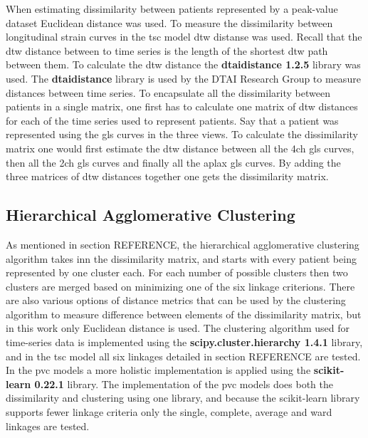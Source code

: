 When estimating dissimilarity between patients represented by a peak-value dataset Euclidean distance was used. To measure the dissimilarity between longitudinal strain curves in the \acrshort{tsc} model \acrshort{dtw} distanse was used. Recall that the \acrshort{dtw} distance between to time series is the length of the shortest \acrshort{dtw} path between them. To calculate the \acrshort{dtw} distance the \textbf{dtaidistance 1.2.5} library was used. The \textbf{dtaidistance} library is used by the DTAI Research Group to measure distances between time series. To encapsulate all the dissimilarity between patients in a single matrix, one first has to calculate one matrix of \acrshort{dtw} distances for each of the time series used to represent patients. Say that a patient was represented using the \acrshort{gls} curves in the three views. To calculate the dissimilarity matrix one would first estimate the \acrshort{dtw} distance between all the \acrshort{4ch} \acrshort{gls} curves, then all the \acrshort{2ch} \acrshort{gls} curves and finally all the \acrshort{aplax} \acrshort{gls} curves. By adding the three matrices of \acrshort{dtw} distances together one gets the dissimilarity matrix. \bigskip

\subsection{Hierarchical Agglomerative Clustering}

As mentioned in section REFERENCE, the hierarchical agglomerative clustering algorithm takes inn the dissimilarity matrix, and starts with every patient being represented by one cluster each. For each number of possible clusters then two clusters are merged based on minimizing one of the six linkage criterions. There are also various options of distance metrics that can be used by the clustering algorithm to measure difference between elements of the dissimilarity matrix, but in this work only Euclidean distance is used. The clustering algorithm used for time-series data is implemented using the \textbf{scipy.cluster.hierarchy 1.4.1} library, and in the \acrshort{tsc} model all six linkages detailed in section REFERENCE are tested. In the \acrshort{pvc} models a more holistic implementation is applied using the \textbf{scikit-learn 0.22.1} library. The implementation of the \acrshort{pvc} models does both the dissimilarity and clustering using one library, and because the scikit-learn library supports fewer linkage criteria only the single, complete, average and ward linkages are tested. 

